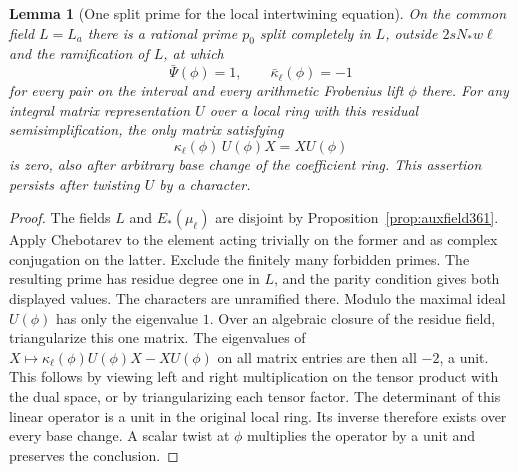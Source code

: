 \documentclass[a4paper,11pt]{article}
\newtheorem{lemma}[proposition]{Lemma}
\theoremstyle{definition}
\theoremstyle{remark}
\numberwithin{equation}{section}
\begin{document}
\begin{lemma}[One split prime for the local intertwining equation]
\label{lem:frobtest366}
On the common field \(L=L_a\) there is a rational prime \(p_0\)
split completely in \(L\), outside \(2sN_*w\ell\) and the
ramification of \(L\), at which
\[
      \bar\Psi(\phi)=1,\qquad \bar\kappa_\ell(\phi)=-1
\]
for every pair on the interval and every arithmetic Frobenius
lift \(\phi\) there. For any integral matrix representation
\(U\) over a local ring with this residual semisimplification,
the only matrix satisfying
\[
          \kappa_\ell(\phi)\,U(\phi)X=XU(\phi)
\]
is zero, also after arbitrary base change of the coefficient
ring. This assertion persists after twisting \(U\) by a character.
\end{lemma}
\begin{proof}
The fields \(L\) and \(E_*(\mu_\ell)\) are disjoint by
Proposition~\ref{prop:auxfield361}. Apply Chebotarev to the
element acting trivially on the former and as complex
conjugation on the latter. Exclude the finitely many
forbidden primes. The resulting prime has residue degree
one in \(L\), and the parity condition gives both displayed
values. The characters are unramified there. Modulo the
maximal ideal \(U(\phi)\) has only the eigenvalue \(1\).
Over an algebraic closure of the residue field, triangularize
this one matrix. The eigenvalues of \(X\mapsto
\kappa_\ell(\phi)U(\phi)X-XU(\phi)\) on all matrix entries
are then all \(-2\), a unit. This follows by viewing left
and right multiplication on the tensor product with the
dual space, or by triangularizing each tensor factor. The
determinant of this linear operator is a unit in the original
local ring. Its inverse therefore exists over every base
change. A scalar twist at \(\phi\) multiplies the operator
by a unit and preserves the conclusion.
\end{proof}
\end{document}
